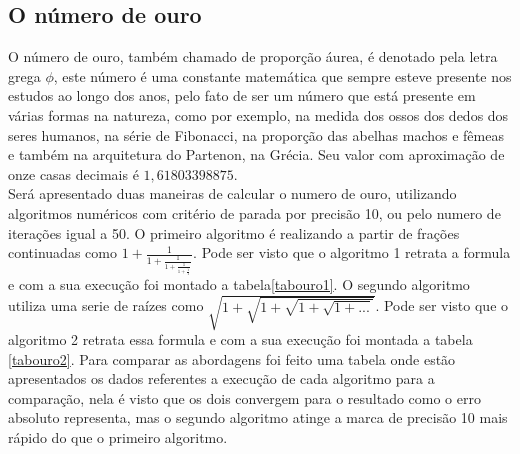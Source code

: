 \documentclass[12pt]{article}
\begin{document}
\subsection{O número de ouro}
O número de ouro, também chamado de proporção áurea, é denotado pela letra grega $\phi$, este número é uma constante matemática que sempre esteve presente nos estudos ao longo dos anos, pelo fato de ser um número que está presente em várias formas na natureza, como por exemplo, na medida dos ossos dos dedos dos seres humanos, na série de Fibonacci, na proporção das abelhas machos e fêmeas e também na arquitetura do Partenon, na Grécia. Seu valor com aproximação de onze casas decimais é $1,61803398875$. \\ 
Será apresentado duas maneiras de calcular o numero de ouro, utilizando algoritmos numéricos com critério de parada por precisão 10, ou pelo numero de iterações igual a 50. O primeiro algoritmo é realizando a partir de  frações continuadas como $1 + \frac{1}{1 + \frac{1}{1 + \frac{1}{1 + \frac{1}{1}}}}$\cite{GoldenRatio}. Pode ser visto que o algoritmo 1 retrata a formula e com a sua execução foi montado a tabela\ref{tabouro1}. O segundo algoritmo utiliza uma serie de raízes como $\sqrt{1 + \sqrt{1 + \sqrt{1 + \sqrt{1 + ...}}}}$\cite{GoldenRatio}. Pode ser visto que o algoritmo 2 retrata essa formula e com a sua execução foi montada a tabela \ref{tabouro2}. Para comparar as abordagens foi feito uma tabela onde estão apresentados os dados referentes a execução de cada algoritmo para a comparação, nela é visto que os dois convergem para o resultado como o erro absoluto representa, mas o segundo algoritmo atinge a marca de precisão 10 mais rápido do que o primeiro algoritmo.


\end{document}
